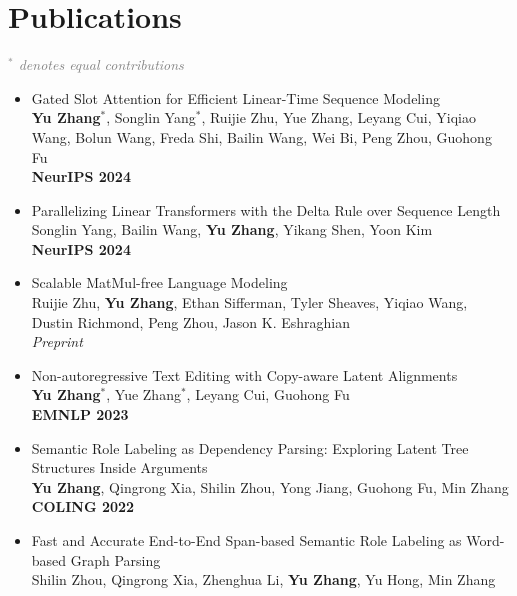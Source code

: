 \documentclass[a4paper,12pt]{article}
\begin{document}
\section{Publications}
\textcolor{gray}{\emph{$^*$ denotes equal contributions}}


\begin{itemize}[leftmargin=18pt]
      \item Gated Slot Attention for Efficient Linear-Time Sequence Modeling \\
            \textbf{Yu Zhang$^*$}, Songlin Yang$^*$, Ruijie Zhu, Yue Zhang, Leyang Cui, Yiqiao Wang, Bolun Wang, Freda Shi, Bailin Wang, Wei Bi, Peng Zhou, Guohong Fu \\
            \textbf{NeurIPS 2024}
      \item Parallelizing Linear Transformers with the Delta Rule over Sequence Length \\
            Songlin Yang, Bailin Wang, \textbf{Yu Zhang}, Yikang Shen, Yoon Kim \\
            \textbf{NeurIPS 2024}
      \item Scalable MatMul-free Language Modeling \\
            Ruijie Zhu, \textbf{Yu Zhang}, Ethan Sifferman, Tyler Sheaves, Yiqiao Wang, Dustin Richmond, Peng Zhou, Jason K. Eshraghian \\
            \emph{Preprint}
      \item Non-autoregressive Text Editing with Copy-aware Latent Alignments \\
            \textbf{Yu Zhang$^*$}, Yue Zhang$^*$, Leyang Cui, Guohong Fu\\
            \textbf{EMNLP 2023}
      \item Semantic Role Labeling as Dependency Parsing: Exploring Latent Tree Structures Inside Arguments\\
            \textbf{Yu Zhang}, Qingrong Xia, Shilin Zhou, Yong Jiang, Guohong Fu, Min Zhang\\
            \textbf{COLING 2022}
      \item Fast and Accurate End-to-End Span-based Semantic Role Labeling as Word-based Graph Parsing\\
            Shilin Zhou, Qingrong Xia, Zhenghua Li, \textbf{Yu Zhang}, Yu Hong, Min Zhang\\

\end{itemize}
\end{document}
